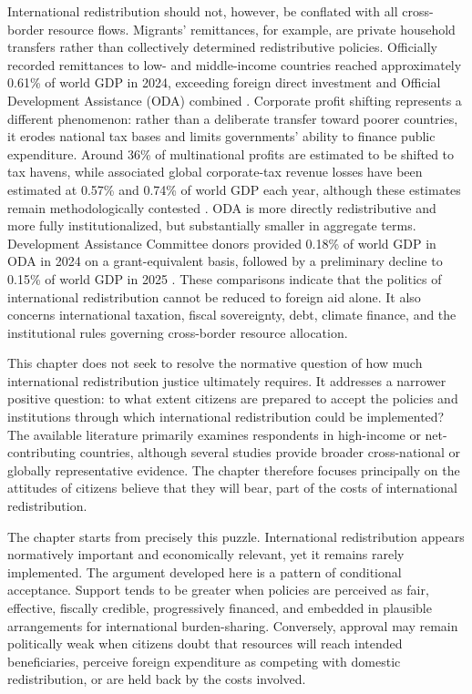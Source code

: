 \documentclass[11pt,a4paper]{article}
\begin{document}
International redistribution should not, however, be conflated with all cross-border resource flows. Migrants' remittances, for example, are private household transfers rather than collectively determined redistributive policies. Officially recorded remittances to low- and middle-income countries reached approximately 0.61\% of world GDP in 2024, exceeding foreign direct investment and Official Development Assistance (ODA) combined \citep{ratha_remittances_2024}. Corporate profit shifting represents a different phenomenon: rather than a deliberate transfer toward poorer countries, it erodes national tax bases and limits governments' ability to finance public expenditure. Around 36\% of multinational profits are estimated to be shifted to tax havens, while associated global corporate-tax revenue losses have been estimated at 0.57\% and 0.74\% of world GDP each year,  although these estimates remain methodologically contested \citep{torslov_missing_2023, cobham_global_2018}. ODA is more directly redistributive and more fully institutionalized, but substantially smaller in aggregate terms. Development Assistance Committee donors provided 0.18\% of world GDP in ODA in 2024 on a grant-equivalent basis, followed by a preliminary decline to 0.15\% of world GDP in 2025 \citep{oecd_final_oda_2025, oecd_preliminary_oda_2026}. 
These comparisons indicate that the politics of international redistribution cannot be reduced to foreign aid alone. It also concerns international taxation, fiscal sovereignty, debt, climate finance, and the institutional rules governing cross-border resource allocation.

This chapter does not seek to resolve the normative question of how much international redistribution justice ultimately requires. It addresses a narrower positive question: to what extent citizens are prepared to accept the policies and institutions through which international redistribution could be implemented? The available literature primarily examines respondents in high-income or net-contributing countries, although several studies provide broader cross-national or globally representative evidence. The chapter therefore focuses principally on the attitudes of citizens  believe that they will bear, part of the costs of international redistribution.

The chapter starts from precisely this puzzle. International redistribution appears normatively important and economically relevant, yet it remains rarely implemented. The argument developed here is a pattern of conditional acceptance. Support tends to be greater when policies are perceived as fair, effective, fiscally credible, progressively financed, and embedded in plausible arrangements for international burden-sharing. Conversely, approval may remain politically weak when citizens doubt that resources will reach intended beneficiaries, perceive foreign expenditure as competing with domestic redistribution, or are held back by the costs involved.
\end{document}
